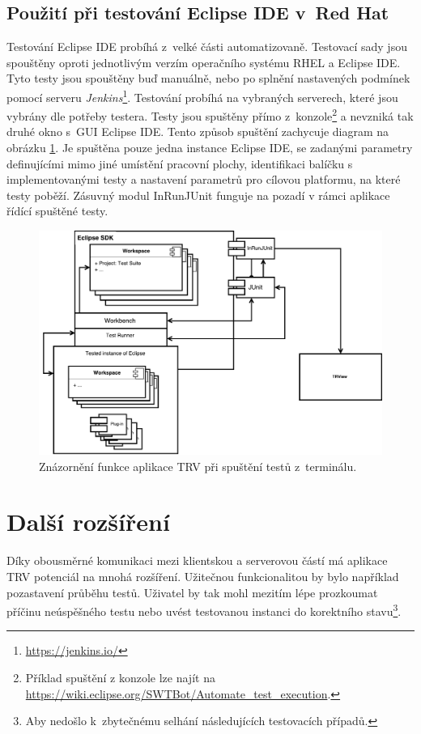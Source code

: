     \subsection{Použití při testování Eclipse IDE v~Red Hat}
    Testování Eclipse IDE probíhá z~velké části automatizovaně. Testovací sady jsou spouštěny oproti jednotlivým verzím operačního systému RHEL a Eclipse IDE. Tyto testy jsou spouštěny buď manuálně, nebo po splnění nastavených podmínek pomocí serveru \emph{Jenkins}\footnote{\url{https://jenkins.io/}}. Testování probíhá na vybraných serverech, které jsou vybrány dle potřeby testera. Testy jsou spuštěny přímo z~konzole\footnote{Příklad spuštění z konzole lze najít na \url{https://wiki.eclipse.org/SWTBot/Automate_test_execution}.} a nevzniká tak druhé okno s~GUI Eclipse IDE. Tento způsob spuštění zachycuje diagram na obrázku \ref{fig:TRV_run_from_term}. Je spuštěna pouze jedna instance Eclipse IDE, se zadanými parametry definujícími mimo jiné umístění pracovní plochy, identifikaci balíčku s implementovanými testy a nastavení parametrů pro cílovou platformu, na které testy poběží. Zásuvný modul InRunJUnit funguje na pozadí v rámci aplikace řídící spuštěné testy.

    \begin{figure}
	\includegraphics[width=\textwidth, center]{obrazky-figures/TRV_run_from_term.pdf}
	\caption{Znázornění funkce aplikace TRV při spuštění testů z~terminálu.}
	\label{fig:TRV_run_from_term}
      \end{figure}

  \section{Další rozšíření}
  Díky obousměrné komunikaci mezi klientskou a serverovou částí má aplikace TRV potenciál na mnohá rozšíření. Užitečnou funkcionalitou by bylo například pozastavení průběhu testů. Uživatel by tak mohl mezitím lépe prozkoumat příčinu neúspěšného testu nebo uvést testovanou instanci do korektního stavu\footnote{Aby nedošlo k~zbytečnému selhání následujících testovacích případů.}. 
  

